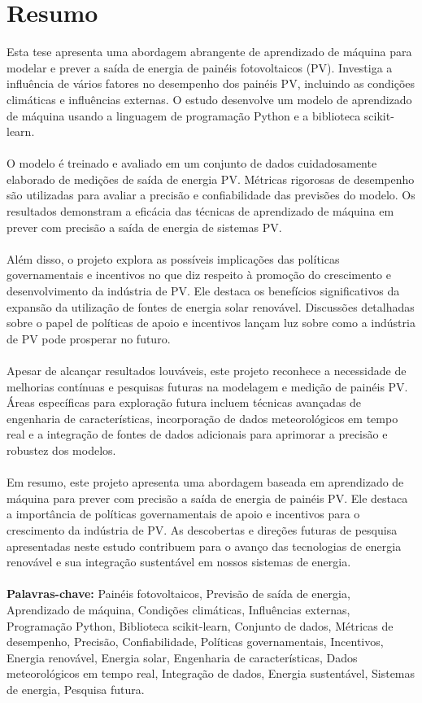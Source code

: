 \documentclass{report}
\begin{document}
\section*{Resumo}
Esta tese apresenta uma abordagem abrangente de aprendizado de máquina para modelar e prever a saída de energia de painéis fotovoltaicos (PV). Investiga a influência de vários fatores no desempenho dos painéis PV, incluindo as condições climáticas e influências externas. O estudo desenvolve um modelo de aprendizado de máquina usando a linguagem de programação Python e a biblioteca scikit-learn.\\
\\
O modelo é treinado e avaliado em um conjunto de dados cuidadosamente elaborado de medições de saída de energia PV. Métricas rigorosas de desempenho são utilizadas para avaliar a precisão e confiabilidade das previsões do modelo. Os resultados demonstram a eficácia das técnicas de aprendizado de máquina em prever com precisão a saída de energia de sistemas PV.\\
\\
Além disso, o projeto explora as possíveis implicações das políticas governamentais e incentivos no que diz respeito à promoção do crescimento e desenvolvimento da indústria de PV. Ele destaca os benefícios significativos da expansão da utilização de fontes de energia solar renovável. Discussões detalhadas sobre o papel de políticas de apoio e incentivos lançam luz sobre como a indústria de PV pode prosperar no futuro.\\
\\
Apesar de alcançar resultados louváveis, este projeto reconhece a necessidade de melhorias contínuas e pesquisas futuras na modelagem e medição de painéis PV. Áreas específicas para exploração futura incluem técnicas avançadas de engenharia de características, incorporação de dados meteorológicos em tempo real e a integração de fontes de dados adicionais para aprimorar a precisão e robustez dos modelos.\\
\\
Em resumo, este projeto apresenta uma abordagem baseada em aprendizado de máquina para prever com precisão a saída de energia de painéis PV. Ele destaca a importância de políticas governamentais de apoio e incentivos para o crescimento da indústria de PV. As descobertas e direções futuras de pesquisa apresentadas neste estudo contribuem para o avanço das tecnologias de energia renovável e sua integração sustentável em nossos sistemas de energia.\\
\\
\textbf{Palavras-chave:} Painéis fotovoltaicos, Previsão de saída de energia, Aprendizado de máquina, Condições climáticas, Influências externas, Programação Python, Biblioteca scikit-learn, Conjunto de dados, Métricas de desempenho, Precisão, Confiabilidade, Políticas governamentais, Incentivos, Energia renovável, Energia solar, Engenharia de características, Dados meteorológicos em tempo real, Integração de dados, Energia sustentável, Sistemas de energia, Pesquisa futura.
\end{document}
